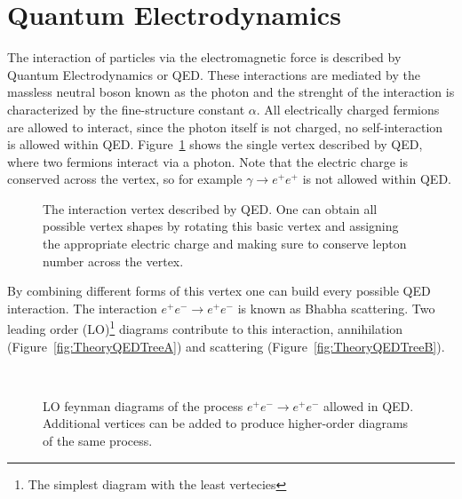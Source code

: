 \section{Quantum Electrodynamics}

The interaction of particles via the electromagnetic force is described by Quantum Electrodynamics or QED. These interactions are mediated by the massless neutral boson known as the photon and the strenght of the interaction is characterized by the fine-structure constant $\alpha$. All electrically charged fermions are allowed to interact, since the photon itself is not charged, no self-interaction is allowed within QED. Figure~\ref{fig:TheorySimpleQED} shows the single vertex described by QED, where two fermions interact via a photon. Note that the electric charge is conserved across the vertex, so for example $\gamma\rightarrow e^{+}e^{+}$ is not allowed within QED.

\begin{figure}
  \centering
  
  \caption{The interaction vertex described by QED. One can obtain all possible vertex shapes by rotating this basic vertex and assigning the appropriate electric charge and making sure to conserve lepton number across the vertex.} \label{fig:TheorySimpleQED}
\end{figure}

By combining different forms of this vertex one can build every possible QED interaction. The interaction $e^{+}e^{-}\rightarrow e^{+}e^{-}$ is known as Bhabha scattering. Two leading order (LO)\footnote{The simplest diagram with the least vertecies} diagrams contribute to this interaction, annihilation (Figure~\ref{fig:TheoryQEDTreeA}) and scattering (Figure~\ref{fig:TheoryQEDTreeB}).

\begin{figure}
  \centering
  \begin{minipage}[][][t]{.47\textwidth}
    \centering
    
     \label{fig:TheoryQEDTreeA}
  \end{minipage}
  \,
  \begin{minipage}[][][t]{.47\textwidth}
    \centering
    
     \label{fig:TheoryQEDTreeB}
  \end{minipage}
  \caption{LO feynman diagrams of the process $e^{+}e^{-}\rightarrow e^{+}e^{-}$ allowed in QED. Additional vertices can be added to produce higher-order diagrams of the same process.}
  \label{fig:TheoryQEDTree}
\end{figure}

